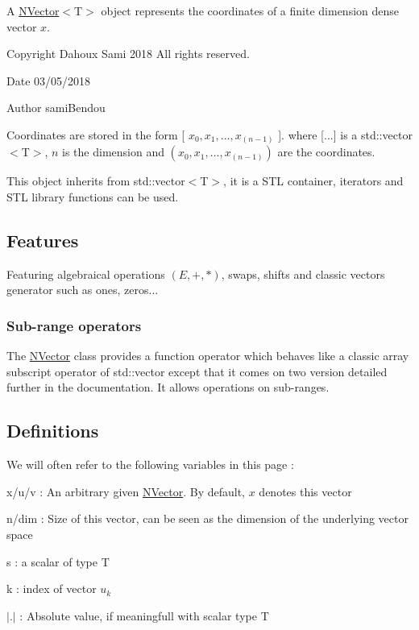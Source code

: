 A {\ttfamily \mbox{\hyperlink{class_n_vector}{N\+Vector}}$<$T$>$} object represents the coordinates of a finite dimension dense vector $ x $. 

\begin{DoxyCopyright}{Copyright}
Dahoux Sami 2018 All rights reserved. 
\end{DoxyCopyright}
\begin{DoxyDate}{Date}
03/05/2018 
\end{DoxyDate}
\begin{DoxyAuthor}{Author}
sami\+Bendou
\end{DoxyAuthor}
Coordinates are stored in the form {\ttfamily \mbox{[}} $ x_0, x_1, ..., x_{(n-1)} $ {\ttfamily \mbox{]}}. where {\ttfamily \mbox{[}...\mbox{]}} is a {\ttfamily std\+::vector$<$T$>$}, $ n $ is the dimension and $ (x_0, x_1, ..., x_{(n-1)}) $ are the coordinates.

This object inherits from {\ttfamily std\+::vector$<$T$>$}, it is a S\+TL container, iterators and S\+TL library functions can be used.\hypertarget{class_n_vector_Features}{}\subsection{Features}\label{class_n_vector_Features}
Featuring algebraical operations $ (E, +, *) $, swaps, shifts and classic vectors generator such as ones, zeros...\hypertarget{class_n_vector_FuncOpVec}{}\subsubsection{Sub-\/range operators}\label{class_n_vector_FuncOpVec}
The {\ttfamily \mbox{\hyperlink{class_n_vector}{N\+Vector}}} class provides a function operator which behaves like a classic array subscript operator of {\ttfamily std\+::vector} except that it comes on two version detailed further in the documentation. It allows operations on sub-\/ranges.\hypertarget{class_n_vector_Definitions}{}\subsection{Definitions}\label{class_n_vector_Definitions}
We will often refer to the following variables in this page \+:
\begin{DoxyItemize}
\item {\ttfamily x}/{\ttfamily u}/{\ttfamily v} \+: An arbitrary given \mbox{\hyperlink{class_n_vector}{N\+Vector}}. By default, $ x $ denotes {\ttfamily this} vector
\item {\ttfamily n}/{\ttfamily dim} \+: Size of this vector, can be seen as the dimension of the underlying vector space
\item {\ttfamily s} \+: a scalar of type {\ttfamily T}
\item {\ttfamily k} \+: index of vector $ u_k $
\item $ |.| $ \+: Absolute value, if meaningfull with scalar type {\ttfamily T} 
\end{DoxyItemize}


